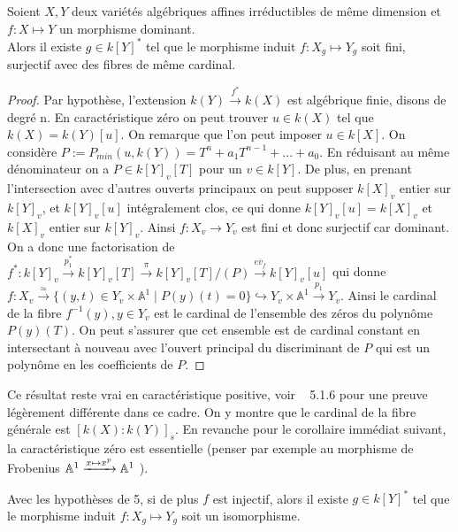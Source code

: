 \begin{prop}Soient $X,Y$ deux variétés algébriques affines irréductibles de même dimension et $f:X \mapsto Y$ un morphisme dominant.\\
Alors il existe $g\in k[Y]^*$ tel que le morphisme induit $f:X_g \mapsto Y_g$ soit fini, surjectif avec des fibres de même cardinal.
\end{prop}
\begin{proof}
Par hypothèse, l'extension $k(Y) \xrightarrow{f^*} k(X)$ est algébrique finie, disons de degré n. En caractéristique zéro on peut trouver $u\in k(X)$ tel que $k(X)=k(Y)[u]$. On remarque que l'on peut imposer $u\in k[X]$. On considère $P:=P_{min}(u, k(Y))=T^n+a_1T^{n-1}+...+a_0$. En réduisant au même dénominateur on a $P\in k[Y]_v[T]$ pour un $v\in k[Y]$. De plus, en prenant l'intersection avec d'autres ouverts principaux on peut supposer $k[X]_v$ entier sur $k[Y]_v$, et $k[Y]_v[u]$ intégralement clos, ce qui donne $k[Y]_v[u]=k[X]_v$ et $k[X]_v$ entier sur $k[Y]_v$. Ainsi $f:X_v \rightarrow Y_v$ est fini et donc surjectif car dominant.\\
On a donc une factorisation de $f^*:k[Y]_v\xrightarrow{p_1^*}k[Y]_v[T]\xrightarrow{\pi}k[Y]_v[T]/(P)\xrightarrow{\overline{ev_f}}k[Y]_v[u]$ qui donne $f:X_v \xrightarrow{\simeq} \lbrace (y,t) \in Y_v\times \mathbb{A}^1\mid P(y)(t)=0\rbrace \hookrightarrow Y_v\times \mathbb{A}^1 \xrightarrow{p_1} Y_v$. Ainsi le cardinal de la fibre $f^{-1}(y), y\in Y_v$ est le cardinal de l'ensemble des zéros du polynôme $P(y)(T)$. On peut s'assurer que cet ensemble est de cardinal constant en intersectant à nouveau avec l'ouvert principal du discriminant de $P$ qui est un polynôme en les coefficients de $P$.
\end{proof}

Ce résultat reste vrai en caractéristique positive, voir 
~\cite{LAGSpringer} 5.1.6 pour une preuve légèrement différente dans ce cadre. On y montre que le cardinal de la fibre générale est $[k(X):k(Y)]_s$. En revanche pour le corollaire immédiat suivant, la caractéristique zéro est essentielle (penser par exemple au morphisme de Frobenius $\mathbb{A}^1 \xrightarrow{x \mapsto x^p} \mathbb{A}^1$ ). 
\begin{cor}
Avec les hypothèses de 5, si de plus $f$ est injectif, alors il existe $g\in k[Y]^*$ tel que le morphisme induit $f:X_g \mapsto Y_g$ soit un isomorphisme.
\end{cor}

